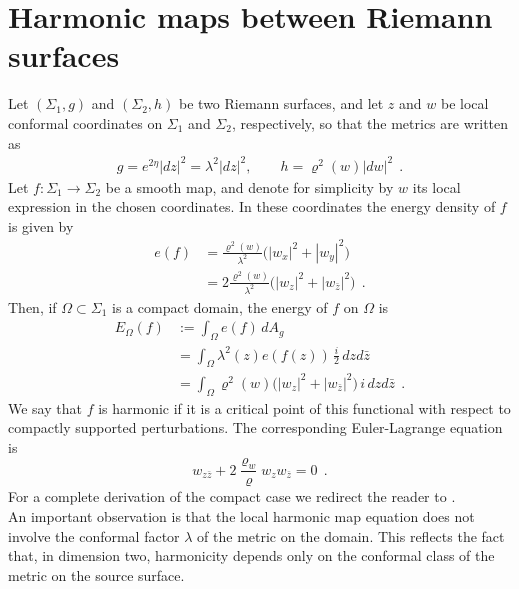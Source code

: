 \documentclass[a4paper,11pt,openright,twoside]{book}
\renewcommand{\Omega}{\varOmega}
\renewcommand{\rho}{\varrho}
\newcommand{\1}{\mathds{1}}
\theoremstyle{plain}
\theoremstyle{definition}
\theoremstyle{remark}
\begin{document}
\section{Harmonic maps between Riemann surfaces}
Let $(\Sigma_1,g)$ and $(\Sigma_2,h)$ be two Riemann surfaces, and let $z$ and $w$ be local conformal coordinates on $\Sigma_1$ and $\Sigma_2$, respectively, so that the metrics are written as
\begin{align*}
	g=e^{2\eta}|dz|^2 = \lambda^2|dz|^2,
	\qquad
	h=\rho^2(w)|dw|^2
	\ \ .
\end{align*}
Let $f:\Sigma_1\to \Sigma_2$ be a smooth map, and denote for simplicity by $w$ its local expression in the chosen coordinates. In these coordinates the energy density of $f$ is given by
\begin{align*}
	e(f)
	&=
	\frac{\rho^2(w)}{\lambda^2}\bigl(|w_x|^2+|w_y|^2\bigr)\\
	&=
	2\frac{\rho^2(w)}{\lambda^2}\bigl(|w_z|^2+|w_{\bar z}|^2\bigr)
	\ \ .
\end{align*}
Then, if $\Omega\subset \Sigma_1$ is a compact domain, the energy of $f$ on $\Omega$ is
\begin{align*}
	E_\Omega(f)
	&:=
	\int_\Omega e(f)\, dA_g\\
	&=
	\int_\Omega \lambda^2(z)e(f(z))\, \frac{i}{2}\, dzd\bar z\\
	&=
	\int_\Omega \rho^2(w)\bigl(|w_z|^2+|w_{\bar z}|^2\bigr)\, i\, dzd\bar z
	\ \ .
\end{align*}
We say that $f$ is harmonic if it is a critical point of this functional with respect to compactly supported perturbations. The corresponding Euler-Lagrange equation is
\[
w_{z\bar z}+2\frac{\rho_w}{\rho}w_zw_{\bar z}=0
\ \ .
\]
For a complete derivation of the compact case we redirect the reader to \cite{jost2006compact}.\\

An important observation is that the local harmonic map equation does not involve the conformal factor $\lambda$ of the metric on the domain. This reflects the fact that, in dimension two, harmonicity depends only on the conformal class of the metric on the source surface.
\end{document}
